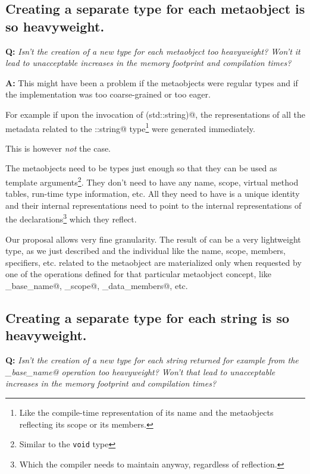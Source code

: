 \subsection{Creating a separate type for each metaobject is so heavyweight.}

\textbf{Q:} {\em Isn't the creation of a new type for each metaobject too
heavyweight? Won't it lead to unacceptable increases in the memory footprint
and compilation times?}

\textbf{A:} This might have been a problem if the metaobjects were regular
types and if the implementation was too coarse-grained or too eager.

For example if upon the invocation of \verb@reflexpr(std::string)@, the representations
of all the metadata related to the \verb@std::string@ type\footnote{Like
the compile-time representation of its name and the metaobjects reflecting its scope
or its members.} were generated immediately.

This is however {\em not} the case.

The metaobjects need to be types just enough so that they can be used
as template arguments\footnote{Similar to the \texttt{void} type}.
They don't need to have any name, scope, 
virtual method tables, run-time type information,
etc. All they need to have is a unique identity and their internal representations
need to point to the internal representations of the declarations\footnote
{Which the compiler needs to maintain anyway, regardless of reflection.}
which they reflect.

Our proposal allows very fine granularity. The result of \verb@reflexpr@
can be a very lightweight type, as we just described and the individual
 like the name, scope, members, specifiers, etc. related
to the metaobject are materialized only when requested by one of the operations
defined for that particular metaobject concept, like \verb@get_base_name@,
\verb@get_scope@, \verb@get_data_members@, etc.

\subsection{Creating a separate type for each string is so heavyweight.}

\textbf{Q:} {\em Isn't the creation of a new type for each string returned
for example from the \verb@get_base_name@ operation too heavyweight?
Won't that lead to unacceptable increases in the memory footprint
and compilation times?}

